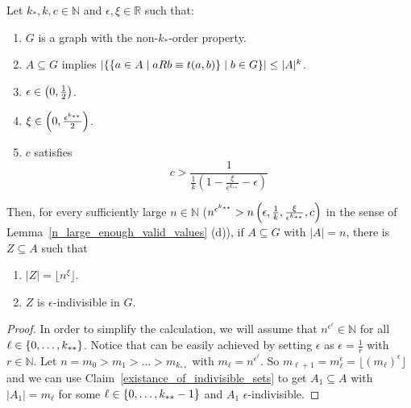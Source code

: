     \begin{lemma}[Claim 4.21] \label{many_values_to_equitative_partition_with_bound_exceptional_pairs}
        Let $k_*, k, c \in \mathbb{N}$ and $\epsilon, \xi \in \mathbb{R}$ such that:
        \begin{enumerate}
            \item\label{itm:4.21.1} $G$ is a graph with the non-$k_*$-order property.
            \item\label{itm:4.21.2} $A \subseteq G$ implies $\left| \left\{ \left\{  a \in A \mid a R b \equiv t(a,b) \right\} \mid b \in G \right\} \right|
                \leq |A|^k$.
            \item\label{itm:4.21.3} $\epsilon \in \left( 0, \frac{1}{2} \right)$.
            \item\label{itm:4.21.4} $\xi \in \left( 0, \frac{\epsilon^{k_{**}}}{2} \right)$.
            \item\label{itm:4.21.5} $c$ satisfies \[
                c > \frac{1}{\frac{1}{k} (1 - \frac{\xi}{\epsilon^{k_{**}}} - \epsilon)}
            \]
        \end{enumerate}
        Then, for every sufficiently large $n \in \mathbb{N}$ ($n^{\epsilon^{k_{**}}} > n\left( \epsilon, \frac{1}{k},
        \frac{\xi}{\epsilon^{k_{**}}}, c \right)$ in the sense of Lemma~\ref{n_large_enough_valid_values} (d)), if
        $A \subseteq G$ with $|A| = n$, there is $Z \subseteq A$ such that
        \begin{enumerate}[label=(\alph*), ref=\alph*]
            \item\label{itm:4.21.a} $|Z| = \lfloor n^\xi \rfloor$.
            \item\label{itm:4.21.b} $Z$ is $\epsilon$-indivisible in $G$.
        \end{enumerate}
        \begin{proof}
            In order to simplify the calculation, we will assume that $n^{\epsilon^\ell} \in \mathbb{N}$ for all
            $\ell \in \left\{ 0, \dots, k_{**} \right\}$.
            Notice that can be easily achieved by setting $\epsilon$ as $\epsilon = \frac{1}{r}$ with $r \in \mathbb{N}$.
            Let $n = m_0 > m_1 > \dots > m_{k_{**}}$ with $m_\ell = n^{\epsilon^{\ell}}$.
            So $m_{\ell+1} = m_\ell^\epsilon = \lfloor (m_\ell)^\epsilon \rfloor$ and we can use Claim~\ref{existance_of_indivisible_sets}
            to get $A_1 \subseteq A$ with $|A_1| = m_\ell$ for some $\ell \in \left\{ 0, \dots, k_{**}-1 \right\}$ and $A_1$ $\epsilon$-indivisible.

\end{proof}
\end{lemma}
